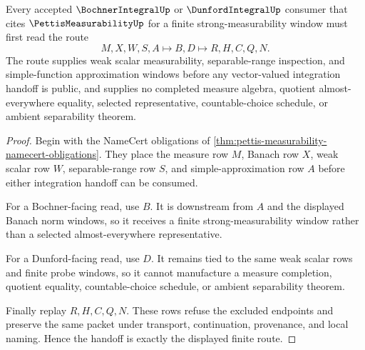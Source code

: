 \begin{theorem}
\label{thm:pettis-measurability-strong-window-handoff}
Every accepted $\BochnerIntegralUp$ or $\DunfordIntegralUp$ consumer that cites $\PettisMeasurabilityUp$ for a finite strong-measurability window must first read the route
$$
M,X,W,S,A \longmapsto B,D \longmapsto R,H,C,Q,N .
$$
The route supplies weak scalar measurability, separable-range inspection, and simple-function approximation windows before any vector-valued integration handoff is public, and supplies no completed measure algebra, quotient almost-everywhere equality, selected representative, countable-choice schedule, or ambient separability theorem.
\end{theorem}
\begin{proof}
Begin with the NameCert obligations of \autoref{thm:pettis-measurability-namecert-obligations}. They place the measure row $M$, Banach row $X$, weak scalar row $W$, separable-range row $S$, and simple-approximation row $A$ before either integration handoff can be consumed.

For a Bochner-facing read, use $B$. It is downstream from $A$ and the displayed Banach norm windows, so it receives a finite strong-measurability window rather than a selected almost-everywhere representative.

For a Dunford-facing read, use $D$. It remains tied to the same weak scalar rows and finite probe windows, so it cannot manufacture a measure completion, quotient equality, countable-choice schedule, or ambient separability theorem.

Finally replay $R,H,C,Q,N$. These rows refuse the excluded endpoints and preserve the same packet under transport, continuation, provenance, and local naming. Hence the handoff is exactly the displayed finite route.
\end{proof}




